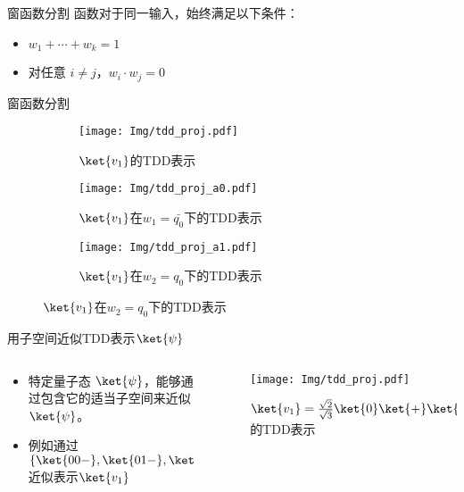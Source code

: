 \documentclass[aspectratio=1610]{ctexbeamer}
\begin{document}
\begin{frame}{窗函数分割}
    函数对于同一输入，始终满足以下条件： 
\begin{itemize}
    \item $w_1+\cdots +w_k=1$
    \item 对任意 $i \neq j$，$w_i \cdot w_j = 0$
\end{itemize} 
\end{frame}
\begin{frame}{窗函数分割}
    \begin{figure}
        \centering
        \begin{subfigure}[b]{.3\textwidth}
            \centering
            \texttt{[image: Img/tdd\_proj.pdf]}
            \caption{$\ket{v_1}$的TDD表示}
            \label{fig:tdd-split-a}
        \end{subfigure}
        \begin{subfigure}[b]{.3\textwidth}
            \centering
            \texttt{[image: Img/tdd\_proj\_a0.pdf]}
            \caption{$\ket{v_1}$在$w_1=\bar{q_0}$下的TDD表示}
        \end{subfigure}
        \quad
        \begin{subfigure}[b]{.3\textwidth}
            \centering
            \texttt{[image: Img/tdd\_proj\_a1.pdf]}
            \caption{$\ket{v_1}$在$w_2=q_0$下的TDD表示}
        \end{subfigure}
    \end{figure}
\end{frame}
\begin{frame}{用子空间近似TDD表示$\ket{\psi}$}
    \begin{columns}
        \begin{column}{0.6\textwidth}
            \begin{itemize}
                \item 特定量子态 $\ket{\psi}$，能够通过包含它的适当子空间来近似 $\ket{\psi}$。
                \item 例如通过$\{\ket{00-},\ket{01-},\ket{10-}\}$近似表示$\ket{v_1}$
            \end{itemize}
        \end{column}
        \begin{column}{0.4\textwidth}
            \begin{figure}
                \centering
                \texttt{[image: Img/tdd\_proj.pdf]}
                \caption{$\ket{v_1}=\frac{\sqrt{2}}{\sqrt{3}}\ket{0}\ket{+}\ket{-}+\frac{1}{\sqrt{3}}\ket{1}\ket{0}\ket{-}$的TDD表示}
            \end{figure}
        \end{column}
    \end{columns}
\end{frame}
\end{document}
